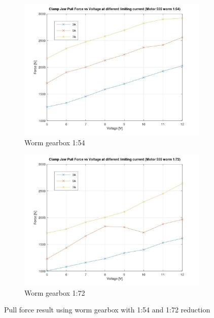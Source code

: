 \begin{figure}
    \centering
    \begin{subfigure}[b]{0.49\textwidth}
        \centering
        \includegraphics[width=\textwidth]{images/05/image84.jpg}
        \caption{Worm gearbox 1:54}
        \label{fig:result-wormgearbox-54}
    \end{subfigure}
    \hfill
    \begin{subfigure}[b]{0.49\textwidth}
        \centering
        \includegraphics[width=\textwidth]{images/05/image107.jpg}
        \caption{Worm gearbox 1:72}
        \label{fig:result-wormgearbox-72}
    \end{subfigure}
    \caption{Pull force result using worm gearbox with 1:54 and 1:72 reduction}
    \label{fig:result-wormgearbox}
\end{figure}

